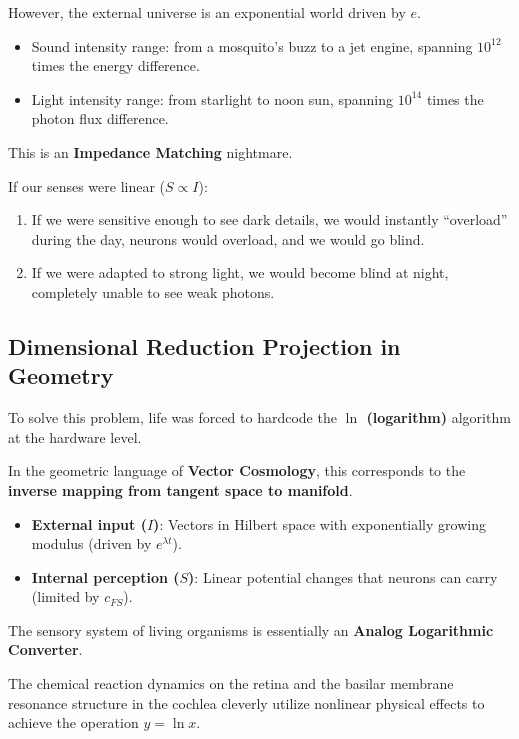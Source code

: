 \documentclass[11pt,a4paper,twoside]{book}
\begin{document}
However, the external universe is an exponential world driven by \textbf{$e$}.

\begin{itemize}
\item Sound intensity range: from a mosquito's buzz to a jet engine, spanning $10^{12}$ times the energy difference.

\item Light intensity range: from starlight to noon sun, spanning $10^{14}$ times the photon flux difference.
\end{itemize}

This is an \textbf{Impedance Matching} nightmare.

If our senses were linear ($S \propto I$):

\begin{enumerate}
\item If we were sensitive enough to see dark details, we would instantly ``overload'' during the day, neurons would overload, and we would go blind.

\item If we were adapted to strong light, we would become blind at night, completely unable to see weak photons.
\end{enumerate}

\subsection{Dimensional Reduction Projection in Geometry}

To solve this problem, life was forced to hardcode the \textbf{$\ln$ (logarithm)} algorithm at the hardware level.

In the geometric language of \textbf{Vector Cosmology}, this corresponds to the \textbf{inverse mapping from tangent space to manifold}.

\begin{itemize}
\item \textbf{External input ($I$)}: Vectors in Hilbert space with exponentially growing modulus (driven by $e^{\lambda t}$).

\item \textbf{Internal perception ($S$)}: Linear potential changes that neurons can carry (limited by $c_{FS}$).
\end{itemize}

The sensory system of living organisms is essentially an \textbf{Analog Logarithmic Converter}.

The chemical reaction dynamics on the retina and the basilar membrane resonance structure in the cochlea cleverly utilize nonlinear physical effects to achieve the operation $y = \ln x$.
\end{document}
